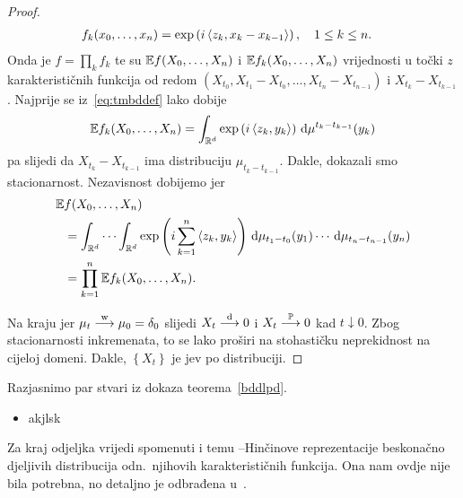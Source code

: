 \documentclass[main.tex]{subfiles}
\begin{document}
\begin{proof}
\begin{equation}
\begin{aligned}
			 & f_k(x_0, \ldots, x_n) = \exp \left( i \left\langle {z_k}, {x_k-x_{k-1}} \right\rangle \right), \quad 1 \le k \le n.
		\end{aligned}
	\end{equation}
	Onda je \( f = \prod_k f_k \) te su \( \mathbb{E} f(X_0, \ldots, X_n) \) i \( \mathbb{E} f_k(X_0, \ldots, X_n) \)
	vrijednosti u točki \( z \) karakterističnih funkcija od redom \( (X_{t_0}, X_{t_1}-X_{t_0},\ldots, X_{t_n}-X_{t_{n-1}}) \) i \( X_{t_k}-X_{t_{k-1}} \). Najprije se iz~\eqref{eq:tmbddef} lako dobije
	\begin{equation}
		\mathbb{E} f_k(X_0, \ldots, X_n) = \int_{\mathbb{R}^d} \exp\left(i\left\langle {z_k}, {y_k} \right\rangle\right) \,\mathrm d \mu^{t_k-t_{k-1}} (y_k)
	\end{equation}
	pa slijedi da \( X_{t_k}-X_{t_{k-1}} \) ima distribuciju \( \mu_{t_k-t_{k-1}} \). Dakle, dokazali smo stacionarnost. Nezavisnost dobijemo jer
	\begin{equation}
		\begin{aligned}
			\mathbb{E} & f(X_0, \ldots, X_n)                                                                \\
			   & = \int_{\mathbb{R}^d} \cdots \int_{\mathbb{R}^d} \exp \left( i \sum_{k=1}^n \left\langle {z_k}, {y_k} \right\rangle \right)
			\,\mathrm d \mu_{t_1-t_0}(y_1) \cdots \,\mathrm d \mu_{t_n-t_{n-1}} (y_n)                                 \\
			   & = \prod_{k=1}^n \mathbb{E} f_k(X_0, \ldots, X_n).
		\end{aligned}
	\end{equation}

	Na kraju jer \( \mu_t \stackrel{\mathrm w}{\longrightarrow} \mu_0 = \delta_0  \) slijedi \( X_t \stackrel{\mathrm d}{\longrightarrow} 0 \) i \( X_t \stackrel{\mathbb P}{\longrightarrow} 0 \) kad \( t \downarrow 0 \). Zbog stacionarnosti inkremenata, to se lako proširi na stohastičku neprekidnost na cijeloj domeni. Dakle, \( \left\{ X_t \right\} \) je \levy jev po distribuciji.
\end{proof}

\begin{komentar} Razjasnimo par stvari iz dokaza teorema~\ref{bddlpd}.
	\begin{itemize}
		\item akjlsk
	\end{itemize}
\end{komentar}

Za kraj odjeljka vrijedi spomenuti i temu \levy --Hinčinove reprezentacije beskonačno djeljivih distribucija odn.\
njihovih karakterističnih funkcija. Ona nam ovdje nije bila potrebna, no detaljno je
odbrađena u~\cite[\textsection 8]{sato}.
\end{document}
